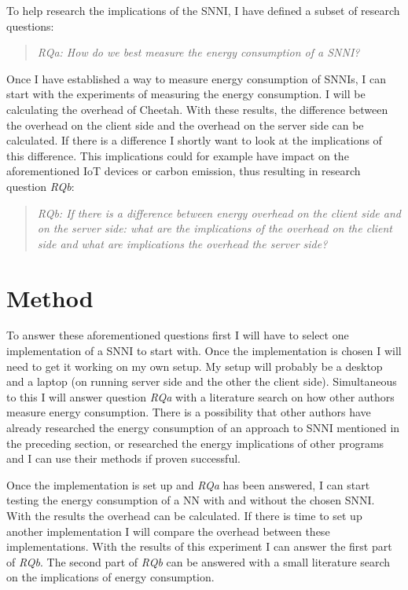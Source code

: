 \documentclass[../theses.tex]{subfiles}
\begin{document}
\noindent To help research the implications of the SNNI, I have defined a subset of research questions:

\begin{quote} \emph{RQa: How do we best measure the energy consumption of a SNNI?} \end{quote}

\noindent Once I have established a way to measure energy consumption of SNNIs, I can start with the experiments of measuring the energy consumption. I will be calculating the overhead of Cheetah. With these results, the difference between the overhead on the client side and the overhead on the server side can be calculated. If there is a difference I shortly want to look at the implications of this difference. This implications could for example have impact on the aforementioned IoT devices or carbon emission, thus resulting in research question \textit{RQb}:

\begin{quote} \emph{RQb: If there is a difference between energy overhead on the client side and on the server side: what are the implications of the overhead on the client side and what are implications the overhead the server side?} \end{quote}

\section{Method}
To answer these aforementioned questions first I will have to select one implementation of a SNNI to start with. Once the implementation is chosen I will need to get it working on my own setup. My setup will probably be a desktop and a laptop (on running server side and the other the client side). Simultaneous to this I will answer question \textit{RQa} with a literature search on how other authors measure energy consumption. There is a possibility that other authors have already researched the energy consumption of an approach to SNNI mentioned in the preceding section, or researched the energy implications of other programs and I can use their methods if proven successful.

Once the implementation is set up and \textit{RQa} has been answered, I can start testing the energy consumption of a NN with and without the chosen SNNI. With the results the overhead can be calculated. If there is time to set up another implementation I will compare the overhead between these implementations. With the results of this experiment I can answer the first part of \textit{RQb}. The second part of \textit{RQb} can be answered with a small literature search on the implications of energy consumption. 
\end{document}
